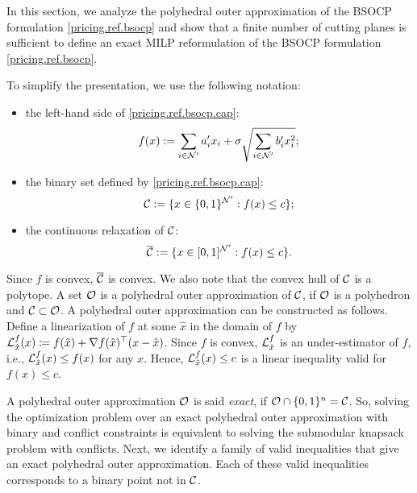 In this section, we analyze the polyhedral outer approximation of the BSOCP formulation \eqref{pricing.ref.bsocp} and show that a finite number of cutting planes is sufficient to define an exact MILP reformulation of the BSOCP formulation \eqref{pricing.ref.bsocp}.

To simplify the presentation, we use the following notation:
\begin{itemize}
    \item the left-hand side of \eqref{pricing.ref.bsocp.cap}: \begin{equation*}
\label{eq.subfunc}
    f(x) := \sum_{i \in \mathcal N'} a'_i x_i  + \sigma\sqrt{\sum_{i\in \mathcal N'} b'_i x_i^2 };
\end{equation*}
\item the binary set defined by \eqref{pricing.ref.bsocp.cap}: \begin{equation*}
\label{eq.cC}
    \mathcal C := \{x \in \{0,1\}^{\mathcal N'}:  f(x) \le c\};
\end{equation*}
\item the continuous relaxation of $\mathcal C$: \begin{equation*}
\label{eq.cCrel}
    \overline{\mathcal C} := \{x \in [0,1]^{\mathcal N'}:  f(x) \le c\}.
\end{equation*}

\end{itemize}
 
Since $f$ is convex,  $ \overline{\mathcal C}$ is convex. We also note that the convex hull of $\mathcal C$ is a polytope. A set $\mathcal O$ is a polyhedral outer approximation of $\mathcal C$, if $\mathcal O$ is a  polyhedron and $\mathcal C \subset \mathcal O$. A  polyhedral outer approximation can be constructed as follows. Define a  linearization of  $f$ at some $\hat{x}$ in the domain of $f$ by $ \mathcal L^{f}_{\hat{x}}(x) \coloneqq f(\hat{x}) + \nabla f(\hat{x}) ^\top (x - \hat{x})$.  Since $f$ is convex,  $ \mathcal L^{f}_{\hat{x}}$ is an under-estimator of $f$, i.e., $ \mathcal L^{f}_{\hat{x}}(x) \le f(x)$ for any $x$. Hence,  $\mathcal L^{f}_{\hat{x}}(x) \le c$ is a linear inequality valid for $f(x) \le c$.


A polyhedral outer  approximation $\mathcal O$ is said  \textit{exact}, if $\mathcal O \cap \{0,1\}^n = \mathcal C$. So, solving the optimization problem over an exact polyhedral outer approximation  with binary and conflict constraints is equivalent to solving the submodular knapsack problem with conflicts. Next, we identify a family of valid inequalities that give an exact polyhedral outer  approximation. Each of these valid inequalities corresponds to a binary point not in $\mathcal C$.   



